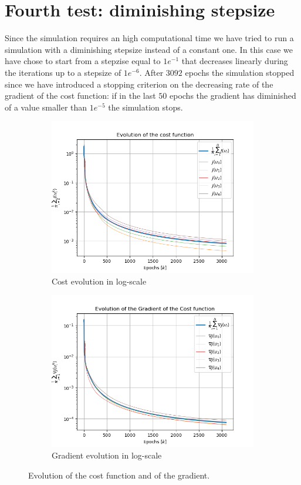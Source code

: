 \documentclass[a4paper,11pt,oneside]{book}
\begin{document}
\section{Fourth test: diminishing stepsize}
Since the simulation requires an high computational time we have tried to run a simulation with a diminishing stepsize instead of a constant one. In this case we have chose to start from a stepzise equal to $1e^{-1}$ that decreases linearly during the iterations up to a stepsize of $1e^{-6}$.
After $3092$ epochs the simulation stopped since we have introduced a stopping criterion on the decreasing rate of the gradient of the cost function: if in the last $50$ epochs the gradient has diminished of a value smaller than $1e^{-5}$ the simulation stops.

\begin{figure}[h]
\centering
	\begin{subfigure}{0.49\textwidth}	
	\includegraphics[width=\textwidth]{diminishing/J-log}
	\caption{Cost evolution in log-scale}
	\end{subfigure}
\hfill
	\begin{subfigure}{0.49\textwidth}	
	\includegraphics[width=\textwidth]{diminishing/norm_gradient_J}
	\caption{Gradient evolution in log-scale}
	\end{subfigure}
\caption{Evolution of the cost function and of the gradient.}
\label{diminish_cost_grad}
\end{figure}
\end{document}
